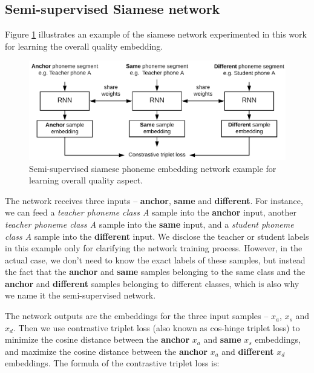 \subsection{Semi-supervised Siamese network}

Figure \ref{fig:ch7:siamese_net} illustrates an example of the siamese network experimented in this work for learning the overall quality embedding.

\begin{figure}[ht!]
    \centering
    \includegraphics[width=\textwidth]{figs/ch7/siamese_net.png}
    \caption{Semi-supervised siamese phoneme embedding network example for learning overall quality aspect.}
    \label{fig:ch7:siamese_net}
\end{figure}

The network receives three inputs -- \textbf{anchor}, \textbf{same} and \textbf{different}. For instance, we can feed a \textit{teacher phoneme class A} sample into the \textbf{anchor} input, another \textit{teacher phoneme class A} sample into the \textbf{same} input, and a \textit{student phoneme class A} sample into the \textbf{different} input. We disclose the teacher or student labels in this example only for clarifying the network training process. However, in the actual case, we don't need to know the exact labels of these samples, but instead the fact that the \textbf{anchor} and \textbf{same} samples belonging to the same class and the \textbf{anchor} and \textbf{different} samples belonging to different classes, which is also why we name it the semi-supervised network. 

The network outputs are the embeddings for the three input samples -- $x_a$, $x_s$ and $x_d$. Then we use contrastive triplet loss (also known as cos-hinge triplet loss) to minimize the cosine distance between the \textbf{anchor} $x_a$ and \textbf{same} $x_s$ embeddings, and maximize the cosine distance between the \textbf{anchor} $x_a$ and \textbf{different} $x_d$ embeddings. The formula of the contrastive triplet loss is:

